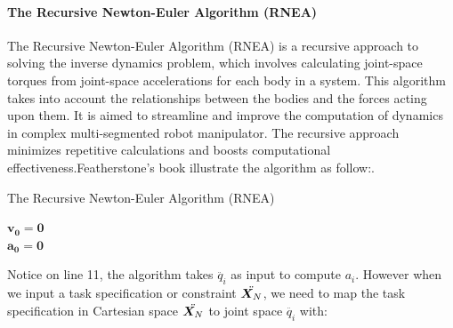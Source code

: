 \documentclass[report.tex]{subfiles}
\begin{document}
    \paragraph*{\large{The Recursive Newton-Euler Algorithm (RNEA)}\\}
    The Recursive Newton-Euler Algorithm (RNEA) is a recursive approach to solving the inverse dynamics problem, which involves calculating joint-space torques from joint-space accelerations for each body in a system. This algorithm takes into account the relationships between the bodies and the forces acting upon them. It is aimed to streamline and improve the computation of dynamics in complex multi-segmented robot manipulator. The recursive approach minimizes repetitive calculations and boosts computational effectiveness.Featherstone's book illustrate the algorithm as follow:\cite{featherstone2007book}.\\
    \begin{algorithm}[H]
        \caption{The Recursive Newton-Euler Algorithm (RNEA)}
        \label{alg:ALG1}
        $\bm{v_0 = 0}$\\
        $\bm{a_0 = 0}$\\
    \end{algorithm}
    Notice on line 11, the algorithm takes $\ddot{q_i}$ as input to compute $a_i$. However when we input a task specification or constraint $\ddot{\bm{X_}N}$, we need to map the task specification in Cartesian space $\ddot{\bm{X_}N}$ to joint space $\ddot{q_i}$ with:
\end{document}
